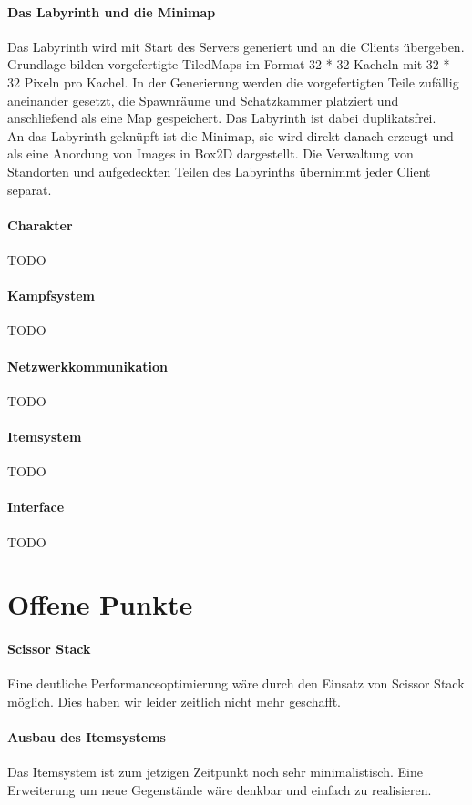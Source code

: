 \documentclass[10pt,a4paper,notitlepage]{scrreprt}
\begin{document}
\begin{flushleft}
\subsubsection{Das Labyrinth und die Minimap}
Das Labyrinth wird mit Start des Servers generiert und an die Clients übergeben. Grundlage bilden vorgefertigte TiledMaps im Format 32 * 32 Kacheln mit 32 * 32 Pixeln pro Kachel. In der Generierung werden die vorgefertigten Teile zufällig aneinander gesetzt, die Spawnräume und Schatzkammer platziert und anschließend als eine Map gespeichert. Das Labyrinth ist dabei duplikatsfrei.\\
An das Labyrinth geknüpft ist die Minimap, sie wird direkt danach erzeugt und als eine Anordung von Images in Box2D dargestellt. Die Verwaltung von Standorten und aufgedeckten Teilen des Labyrinths übernimmt jeder Client separat.\

\subsubsection{Charakter}
TODO

\subsubsection{Kampfsystem} 
TODO

\subsubsection{Netzwerkkommunikation}
TODO

\subsubsection{Itemsystem}
TODO

\subsubsection{Interface}
TODO

\chapter{Offene Punkte}
\subsubsection{Scissor Stack}
Eine deutliche Performanceoptimierung wäre durch den Einsatz von Scissor Stack möglich. Dies haben wir leider zeitlich nicht mehr geschafft.

\subsubsection{Ausbau des Itemsystems}
Das Itemsystem ist zum jetzigen Zeitpunkt noch sehr minimalistisch. Eine Erweiterung um neue Gegenstände wäre denkbar und einfach zu realisieren.
	
\end{flushleft}
\end{document}

